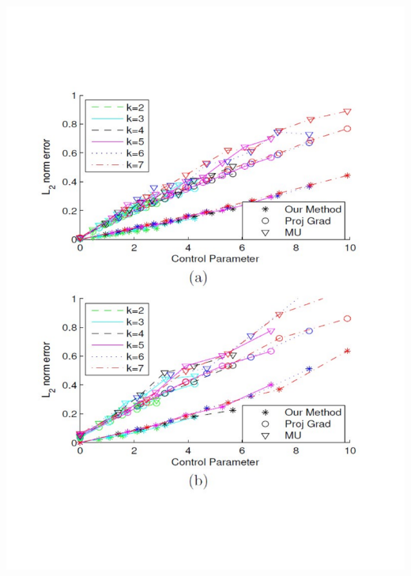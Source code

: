 \documentclass[a4paper,10pt]{article}
\theoremstyle{definition}
\begin{document}
\includegraphics[scale=0.5]{l1_norm_error.pdf}
\end{document}
